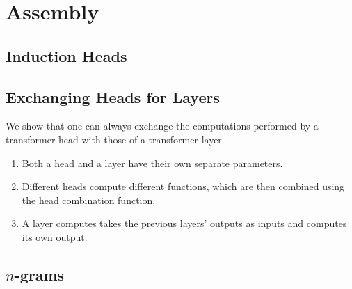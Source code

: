 %
\chapter{Assembly}
%



\section{Induction Heads}


\section{Exchanging Heads for Layers}
We show that one can always exchange the computations performed by a transformer head with those of a transformer layer. 

\begin{enumerate}
    \item Both a head and a layer have their own separate parameters.
    \item Different heads compute different functions, which are then combined using the head combination function.
    \item A layer computes takes the previous layers' outputs as inputs and computes its own output.
\end{enumerate}

\section{\texorpdfstring{$n$}{n}-grams}


